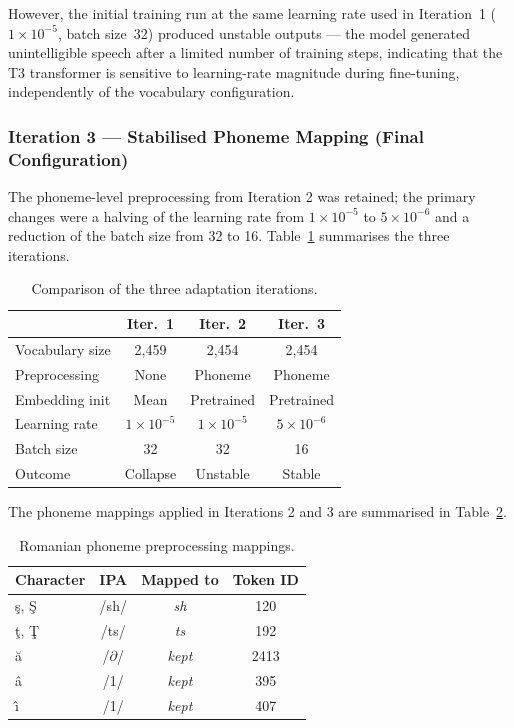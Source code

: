 \documentclass[conference]{IEEEtran}
\begin{document}
However, the initial training run at the same learning rate used in
Iteration~1 ($1\times10^{-5}$, batch size~32) produced unstable
outputs — the model generated unintelligible speech after a limited
number of training steps, indicating that the T3 transformer is
sensitive to learning-rate magnitude during fine-tuning, independently
of the vocabulary configuration.

\subsubsection{Iteration 3 — Stabilised Phoneme Mapping (Final Configuration)}

The phoneme-level preprocessing from Iteration 2 was retained; the
primary changes were a halving of the learning rate from
$1\times10^{-5}$ to $5\times10^{-6}$ and a reduction of the batch
size from 32 to 16.
Table~\ref{tab:iterations} summarises the three iterations.

\begin{table}[h]
\centering
\caption{Comparison of the three adaptation iterations.}
\label{tab:iterations}
\begin{tabular}{lccc}
\toprule
& \textbf{Iter.~1} & \textbf{Iter.~2} & \textbf{Iter.~3} \\
\midrule
Vocabulary size & 2,459 & 2,454 & 2,454 \\
Preprocessing & None & Phoneme & Phoneme \\
Embedding init & Mean & Pretrained & Pretrained \\
Learning rate & $1\times10^{-5}$ & $1\times10^{-5}$ & $5\times10^{-6}$ \\
Batch size & 32 & 32 & 16 \\
Outcome & Collapse & Unstable & Stable \\
\bottomrule
\end{tabular}
\end{table}

The phoneme mappings applied in Iterations 2 and 3 are summarised
in Table~\ref{tab:phoneme_map}.

\begin{table}[h]
\centering
\caption{Romanian phoneme preprocessing mappings.}
\label{tab:phoneme_map}
\begin{tabular}{lccc}
\toprule
Character & IPA & Mapped to & Token ID \\
\midrule
\c{s}, \c{S} & /\textrm{sh}/ & \textit{sh} & 120 \\
\c{t}, \c{T} & /\textrm{ts}/ & \textit{ts} & 192 \\
\u{a} & /$\partial$/ & \textit{kept} & 2413 \\
\^{a} & /\textrm{1}/ & \textit{kept} & 395 \\
\^{\i} & /\textrm{1}/ & \textit{kept} & 407 \\
\bottomrule
\end{tabular}
\end{table}
\end{document}
